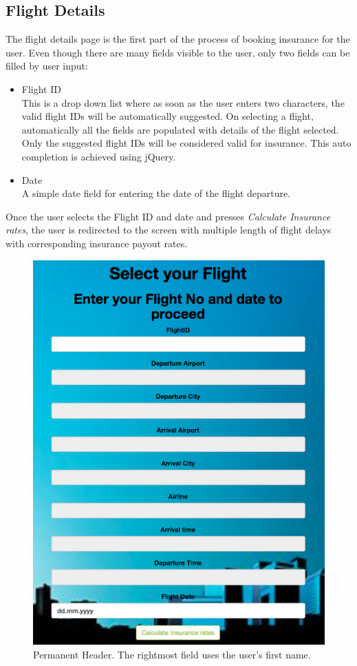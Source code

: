 \subsection{Flight Details}
The flight details page is the first part of the process of booking insurance for the user. Even though there are many fields visible to the user, only two fields can be filled by user input:
\begin{itemize}
    \item Flight ID
    \\This is a drop down list where as soon as the user enters two characters, the valid flight IDs will be automatically suggested. On selecting a flight, automatically all the fields are populated with details of the flight selected. Only the suggested flight IDs will be considered valid for insurance. This auto completion is achieved using jQuery.
    \item Date
    \\ A simple date field for entering the date of the flight departure.
\end{itemize}
Once the user selects the Flight ID and date and presses \textit{Calculate Insurance rates}, the user is redirected to the screen with multiple length of flight delays with corresponding insurance payout rates.

\begin{figure}[h]
    \centering
    \includegraphics[width=\textwidth]{Figures/flight_details.png}
    \caption{Permanent Header. The rightmost field uses the user's first name.}
    \label{fig:flight_details}
\end{figure}

